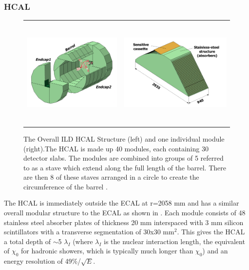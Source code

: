 \subsubsection{HCAL}

\begin{figure}[h]
  \centering
  \begin{tabular}[c]{cc}
    \includegraphics[height=5.5cm]{Experiments/fig/DHCALview_global.png} &
    \includegraphics[height=5.5cm]{Experiments/fig/DHCALview_module.png}
  \end{tabular}
  \caption[HCAL Structure]{The Overall ILD HCAL Structure (left) and one individual module (right).The HCAL is made up 40 modules, each containing 30 detector slabs. The modules are combined into groups of 5 referred to as a stave which extend along the full length of the barrel. There are then 8 of these staves arranged in a circle to create the circumference of the barrel \cite{ILD}.}
  \label{fig:HCAL}
\end{figure}

The \ac{HCAL} is immediately outside the ECAL at r=2058 mm and has a similar overall modular structure to the \ac{ECAL} as shown in . Each module consists of 48 stainless steel absorber plates of thickness 20 mm interspaced with 3 mm silicon scintillators with a transverse segmentation of 30x30 mm$^2$. This gives the \ac{HCAL} a total depth of $\sim$5 $\lambda_I$ (where $\lambda_I$ is the nuclear interaction length, the equivalent of $\chi_0$ for hadronic showers, which is typically much longer than $\chi_0$) and an energy resolution of 49\%/$\sqrt{E}$.

